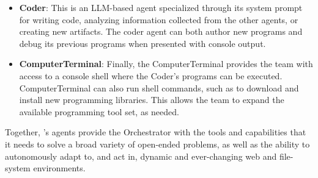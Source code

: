 \begin{itemize}
    \item \textbf{Coder}: This is an LLM-based agent specialized through its system prompt for writing code, analyzing information collected from the other agents, or creating new artifacts. The coder agent can both author new programs and debug its previous programs when presented with console output.   
    
    \item \textbf{ComputerTerminal}: Finally, the ComputerTerminal provides the team with access to a console shell where the Coder's programs can be executed. ComputerTerminal can also run shell commands, such as to download and install new programming libraries. This allows the team to expand the available programming tool set, as needed. 
\end{itemize}

Together, \team's agents provide the Orchestrator with the tools and capabilities that it needs to solve a broad variety of open-ended problems, as well as the ability to autonomously adapt to, and act in, dynamic and ever-changing web and file-system environments.

